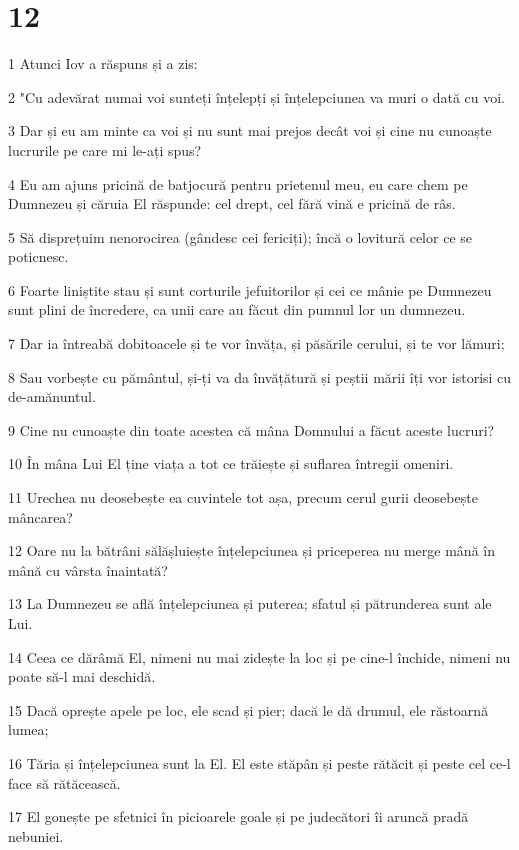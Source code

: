 \chapter{12}

\par 1 Atunci Iov a răspuns și a zis:
\par 2 "Cu adevărat numai voi sunteți înțelepți și înțelepciunea va muri o dată cu voi.
\par 3 Dar și eu am minte ca voi și nu sunt mai prejos decât voi și cine nu cunoaște lucrurile pe care mi le-ați spus?
\par 4 Eu am ajuns pricină de batjocură pentru prietenul meu, eu care chem pe Dumnezeu și căruia El răspunde: cel drept, cel fără vină e pricină de râs.
\par 5 Să disprețuim nenorocirea (gândesc cei fericiți); încă o lovitură celor ce se poticnesc.
\par 6 Foarte liniștite stau și sunt corturile jefuitorilor și cei ce mânie pe Dumnezeu sunt plini de încredere, ca unii care au făcut din pumnul lor un dumnezeu.
\par 7 Dar ia întreabă dobitoacele și te vor învăța, și păsările cerului, și te vor lămuri;
\par 8 Sau vorbește cu pământul, și-ți va da învățătură și peștii mării îți vor istorisi cu de-amănuntul.
\par 9 Cine nu cunoaște din toate acestea că mâna Domnului a făcut aceste lucruri?
\par 10 În mâna Lui El ține viața a tot ce trăiește și suflarea întregii omeniri.
\par 11 Urechea nu deosebește ea cuvintele tot așa, precum cerul gurii deosebește mâncarea?
\par 12 Oare nu la bătrâni sălășluiește înțelepciunea și priceperea nu merge mână în mână cu vârsta înaintată?
\par 13 La Dumnezeu se află înțelepciunea și puterea; sfatul și pătrunderea sunt ale Lui.
\par 14 Ceea ce dărâmă El, nimeni nu mai zidește la loc și pe cine-l închide, nimeni nu poate să-l mai deschidă.
\par 15 Dacă oprește apele pe loc, ele scad și pier; dacă le dă drumul, ele răstoarnă lumea;
\par 16 Tăria și înțelepciunea sunt la El. El este stăpân și peste rătăcit și peste cel ce-l face să rătăcească.
\par 17 El gonește pe sfetnici în picioarele goale și pe judecători îi aruncă pradă nebuniei.
